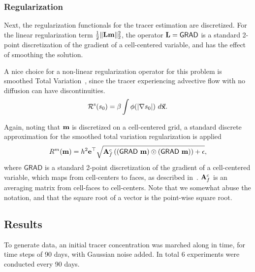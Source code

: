 \documentclass[12pt]{article}
\newcommand{\bfA}	{{\bf{A}}}
\newcommand{\bfL}	{{\bf{L}}}
\newcommand{\bfe}	{{\bf{e}}}
\newcommand{\bfm}	{{\bf{m}}}
\newcommand{\hf}        {{\frac 12}}
\newcommand {\vx}    {\vec {\bf x}}
\renewcommand{\hf}		 {\frac12}
\newcommand{\grad}	{\ensuremath {{\bf{ \nabla}}}}
\newcommand{\CRsat}  {\mathcal{R}^{\text{s}}}     %
\newcommand{\GRADh}  {{\textsf{GRAD}}} %
\begin{document}
\subsubsection{Regularization}
Next, the regularization functionals  for the  tracer estimation are discretized. For the  linear regularization  term $\hf\|\bfL \bfm\|^2_2 $, the operator $\bfL = \GRADh$ is a standard 2-point discretization of the gradient of a cell-centered variable, and has the effect of smoothing the solution.

A nice choice for a non-linear regularization operator for this problem is smoothed Total Variation~\cite{ahh}, since the tracer experiencing advective flow with no diffusion can have discontinuities. 
\begin{equation}
		\CRsat(s_0) = \beta \int  \phi(|\grad s_0|) \ d\vx.
\end{equation} 

Again, noting that $\bfm$ is discretized on a cell-centered grid, a standard discrete 
approximation for the smoothed total variation regularization is applied
\begin{equation*}
\label{eq:nonLinReg}
R^{m}(\bfm) = h^2 \bfe^{\top} \sqrt{ \bfA_{f}^{c} \left( (\GRADh\ \bfm) \odot (\GRADh\ \bfm) \right)  + \epsilon},
\end{equation*}
where $\GRADh$ is a standard 2-point discretization of the gradient of a cell-centered variable, which maps from cell-centers to faces, as described in~\cite{ha,ahh}.
$\bfA_{f}^{c}$ is an averaging matrix from cell-faces to cell-centers.
Note that we somewhat abuse the notation, and that the square root of a vector is the point-wise square root.

\subsection{Results}
To generate data, an initial tracer concentration was marched along in time, for time steps of 90 days, with Gaussian noise added. In total 6 experiments were conducted every 90 days. 
\end{document}
